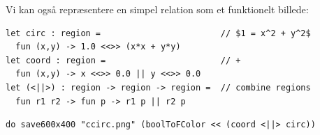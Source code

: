 \documentclass[rgb]{beamer}
\begin{document}
\begin{frame}[fragile]
\begin{footnotesize}


  \vspace{1ex}

  Vi kan også repræsentere en simpel relation som et funktionelt billede:

\begin{lstlisting}[numbers=none,frame=none,mathescape]
let circ : region =                        // $1 = x^2 + y^2$
  fun (x,y) -> 1.0 <<>> (x*x + y*y)
let coord : region =                       // +
  fun (x,y) -> x <<>> 0.0 || y <<>> 0.0
let (<||>) : region -> region -> region =  // combine regions
  fun r1 r2 -> fun p -> r1 p || r2 p
\end{lstlisting}


\begin{lstlisting}[numbers=none,frame=none,mathescape]
do save600x400 "ccirc.png" (boolToFColor << (coord <||> circ))
\end{lstlisting}

  \vspace{1ex}

\hfill
{}\hfill
{}

\end{footnotesize}
\end{frame}
\end{document}
